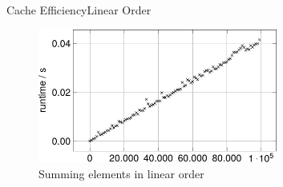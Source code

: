 
%
%  
%
%
%  


\begin{frame}{Cache Efficiency}{Linear Order}
  \begin{figure}
%    
    \includegraphics[width=0.7\textwidth]{Images/Caching/sumlinear-plot.pdf}
    \vspace{-1.0em}
    \caption{Summing elements in linear order}
    \label{fig:caching:sum_linear_order}
  \end{figure}
\end{frame}

